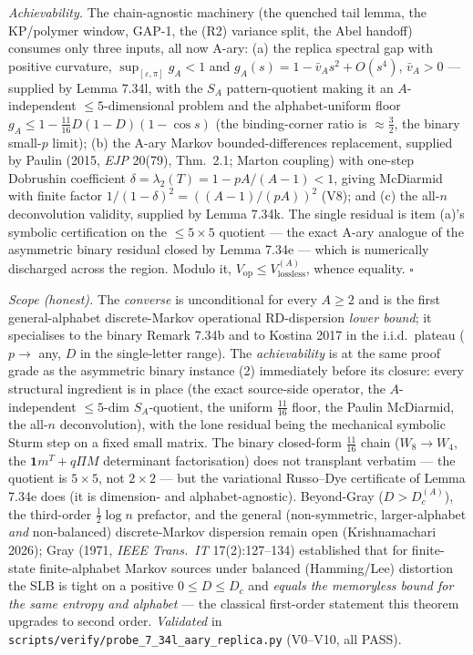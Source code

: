 \documentclass[
]{article}
\begin{document}
\emph{Achievability.} The chain-agnostic machinery (the quenched tail lemma,
the KP/polymer window, GAP-1, the (R2) variance split, the Abel handoff)
consumes only three inputs, all now A-ary: (a) the replica spectral gap with
positive curvature, $\sup_{[\varepsilon,\pi]}g_A<1$ and
$g_A(s)=1-\bar v_As^2+O(s^4)$, $\bar v_A>0$ --- supplied by Lemma 7.34l, with
the $S_A$ pattern-quotient making it an $A$-independent $\le5$-dimensional
problem and the alphabet-uniform floor $g_A\le1-\tfrac{11}{16}D(1-D)
(1-\cos s)$ (the binding-corner ratio is $\approx\tfrac32$, the binary small-$p$
limit); (b) the A-ary Markov bounded-differences
replacement, supplied by Paulin (2015, \emph{EJP} 20(79), Thm.~2.1; Marton
coupling) with one-step Dobrushin coefficient $\delta=\lambda_2(T)=1-pA/(A-1)<1$,
giving McDiarmid with finite factor $1/(1-\delta)^2=((A-1)/(pA))^2$ (V8); and
(c) the all-$n$ deconvolution validity, supplied by Lemma 7.34k. The single
residual is item (a)'s symbolic certification on the $\le5\times5$ quotient ---
the exact A-ary analogue of the asymmetric binary residual closed by Lemma
7.34e --- which is numerically discharged across the region. Modulo it,
$V_{\mathrm{op}}\le V_{\mathrm{lossless}}^{(A)}$, whence equality. \hfill$\square$

\emph{Scope (honest).} The \emph{converse} is unconditional for every $A\ge2$
and is the first general-alphabet discrete-Markov operational RD-dispersion
\emph{lower bound}; it specialises to the binary Remark 7.34b and to Kostina
2017 in the i.i.d.\ plateau ($p\to$ any, $D$ in the single-letter range). The
\emph{achievability} is at the same proof grade as the asymmetric binary
instance (2) immediately before its closure: every structural ingredient is in
place (the exact source-side operator, the $A$-independent $\le5$-dim
$S_A$-quotient, the uniform $\tfrac{11}{16}$ floor, the Paulin McDiarmid, the
all-$n$ deconvolution), with the lone residual being the mechanical symbolic
Sturm step on a fixed small matrix. The binary closed-form $\tfrac{11}{16}$
chain ($W_8\to W_4$, the $\mathbf 1m^T+q\Pi M$ determinant factorisation) does
not transplant verbatim --- the quotient is $5\times5$, not $2\times2$ --- but
the variational Russo--Dye certificate of Lemma 7.34e does (it is dimension-
and alphabet-agnostic). Beyond-Gray ($D>D_c^{(A)}$), the third-order
$\tfrac12\log n$ prefactor, and the general (non-symmetric, larger-alphabet
\emph{and} non-balanced) discrete-Markov dispersion remain open
(Krishnamachari 2026); Gray (1971, \emph{IEEE Trans.\ IT} 17(2):127--134)
established that for finite-state finite-alphabet Markov sources under balanced
(Hamming/Lee) distortion the SLB is tight on a positive $0\le D\le D_c$ and
\emph{equals the memoryless bound for the same entropy and alphabet} --- the
classical first-order statement this theorem upgrades to second order.
\emph{Validated} in \texttt{scripts/verify/probe\_7\_34l\_aary\_replica.py}
(V0--V10, all PASS).
\end{document}
